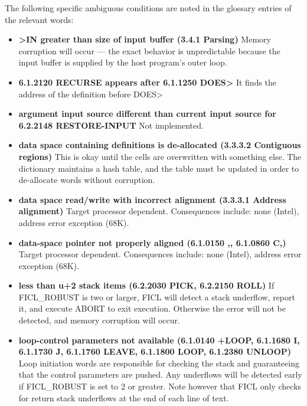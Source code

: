The following specific ambiguous conditions are noted in the glossary entries of the relevant words:
\begin{itemize}[noitemsep]
	\item \textbf{\textgreater IN greater than size of input buffer
		(3.4.1 Parsing)}\newline
	Memory corruption will occur — the exact behavior is
	unpredictable because the input buffer is supplied by the host
	program's outer loop.

	\item \textbf{6.1.2120 RECURSE appears after 6.1.1250
		DOES\textgreater}\newline
	It finds the address of the definition before DOES\textgreater

	\item \textbf{argument input source different than current input
		source for 6.2.2148 RESTORE-INPUT}\newline
	Not implemented.

	\item \textbf{data space containing definitions is de-allocated
		(3.3.3.2 Contiguous regions)}\newline
	This is okay until the cells are overwritten with something
	else. The dictionary maintains a hash table, and the table must
	be updated in order to de-allocate words without corruption.

	\item \textbf{data space read/write with incorrect alignment
		(3.3.3.1 Address alignment)}\newline
	Target processor dependent. Consequences include: none (Intel),
	address error exception (68K).

	\item \textbf{data-space pointer not properly aligned
		(6.1.0150 ,, 6.1.0860 C,)}\newline
	Target processor dependent. Consequences include: none (Intel),
	address error exception (68K).

	\item \textbf{less than u+2 stack items (6.2.2030 PICK,
		6.2.2150 ROLL)}\newline
	If FICL\_ROBUST is two or larger, FICL will detect a stack
	underflow, report it, and execute ABORT to exit execution.
	Otherwise the error will not be detected, and memory corruption
	will occur.

	\item \textbf{loop-control parameters not available
		(6.1.0140 +LOOP, 6.1.1680 I, 6.1.1730 J, 6.1.1760 LEAVE,
		6.1.1800 LOOP, 6.1.2380 UNLOOP)}\newline 
	Loop initiation words are responsible for checking the stack
	and guaranteeing that the control parameters are pushed. Any
	underflows will be detected early if FICL\_ROBUST is set to 2 or
	greater. Note however that FICL only checks for return stack
	underflows at the end of each line of text.


\end{itemize}
